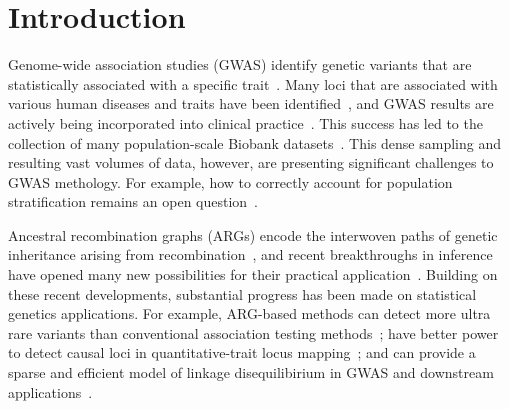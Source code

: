 \documentclass[unnumsec,webpdf,modern,large,namedate]{oup-authoring-template}%
\begin{document}

\maketitle

\section{Introduction}

Genome-wide association studies (GWAS)
identify genetic variants that are statistically
associated with a specific trait~\citep{uffelmann2021}.
Many loci that are associated with various human diseases and
traits have been identified~\citep{locke2015,ishigaki2022,
mahajan2022,yengo2022,mathieson2023},
and GWAS results are actively being incorporated into clinical
practice~\citep{visscher2017}.
This success has led to the collection of many population-scale Biobank
datasets~\citep{tanjo2021practical}.
This dense sampling and resulting vast volumes of data, however,
are presenting significant challenges to GWAS methology.
For example, how to correctly account for population stratification
remains an open question~\citep{uffelmann2021}.

Ancestral recombination graphs (ARGs) encode the interwoven paths
of genetic inheritance arising from recombination~\citep{wong2023general}, and recent
breakthroughs in inference have opened many new possibilities for their
practical application~\citep{lewanski2023era}.
Building on these recent developments, substantial progress has been made
on statistical genetics applications.
For example,  ARG-based methods
can detect more ultra rare variants than conventional association testing
methods~\citep{zhang2023};
have better power to detect causal loci in
quantitative-trait locus mapping~\citep{link2023tree};
and can provide a sparse and efficient model of linkage disequilibirium
in GWAS and downstream applications~\citep{nowbandegani2023extremely}.
\end{document}
